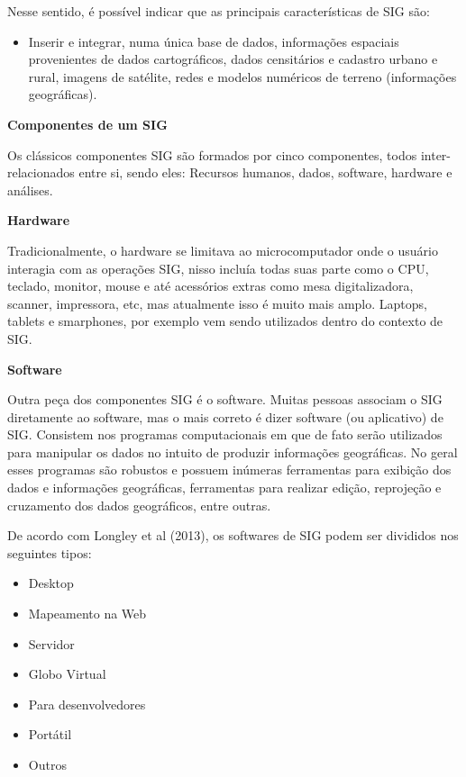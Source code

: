 \documentclass[
]{book}
\providecommand{\tightlist}{%
  \setlength{\itemsep}{0pt}\setlength{\parskip}{0pt}}
\begin{document}
Nesse sentido, é possível indicar que as principais características de SIG são:

\begin{itemize}
\tightlist
\item
  Inserir e integrar, numa única base de dados, informações espaciais provenientes de dados cartográficos, dados censitários e cadastro urbano e rural, imagens de satélite, redes e modelos numéricos de terreno (informações geográficas).
\end{itemize}

\textbf{Componentes de um SIG}

Os clássicos componentes SIG são formados por cinco componentes, todos inter-relacionados entre si, sendo eles: Recursos humanos, dados, software, hardware e análises.

\textbf{Hardware}

Tradicionalmente, o hardware se limitava ao microcomputador onde o usuário interagia com as operações SIG, nisso incluía todas suas parte como o CPU, teclado, monitor, mouse e até acessórios extras como mesa digitalizadora, scanner, impressora, etc, mas atualmente isso é muito mais amplo. Laptops, tablets e smarphones, por exemplo vem sendo utilizados dentro do contexto de SIG.

\textbf{Software}

Outra peça dos componentes SIG é o software. Muitas pessoas associam o SIG diretamente ao software, mas o mais correto é dizer software (ou aplicativo) de SIG. Consistem nos programas computacionais em que de fato serão utilizados para manipular os dados no intuito de produzir informações geográficas. No geral esses programas são robustos e possuem inúmeras ferramentas para exibição dos dados e informações geográficas, ferramentas para realizar edição, reprojeção e cruzamento dos dados geográficos, entre outras.

De acordo com Longley et al (2013), os softwares de SIG podem ser divididos nos seguintes tipos:

\begin{itemize}
\tightlist
\item
  Desktop
\item
  Mapeamento na Web
\item
  Servidor
\item
  Globo Virtual
\item
  Para desenvolvedores
\item
  Portátil
\item
  Outros
\end{itemize}
\end{document}
